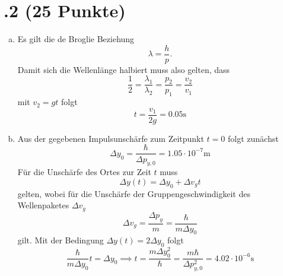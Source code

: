 \section*{\nr.2 \tittwo (25 Punkte)}
\begin{enumerate}[(a)]
\item Es gilt die de Broglie Beziehung
\begin{equation}
  \lambda=\frac{h}{p}.
\end{equation}
Damit sich die Wellenlänge halbiert muss also gelten, dass
\begin{equation}
  \frac{1}{2}=\frac{\lambda_1}{\lambda_2}=\frac{p_2}{p_1}=\frac{v_2}{v_1}
\end{equation}
mit $v_2=gt$ folgt
\begin{equation}
  t=\frac{v_1}{2g}=0.05\mathrm{s}
\end{equation}
\item Aus der gegebenen Impulsunschärfe zum Zeitpunkt $t=0$ folgt zunächst 
\begin{equation}
  \Delta y_0=\frac{\hbar}{\Delta p_{y,0}}=1.05\cdot 10^{-7}\mathrm{m}
\end{equation}
Für die Unschärfe des Ortes zur Zeit $t$ muss
\begin{equation}
  \Delta y(t)=\Delta y_0+\Delta v_g t
\end{equation}
gelten, wobei für die Unschärfe der Gruppengeschwindigkeit des Wellenpaketes $\Delta v_g$ 
\begin{equation}
  \Delta v_g = \frac{\Delta p_y}{m}= \frac{\hbar}{m\Delta y_0}
\end{equation}
gilt.
Mit der Bedingung $\Delta y(t)=2\Delta y_0$ folgt
\begin{equation}
\frac{\hbar}{m\Delta y_0}t=\Delta y_0\implies t=\frac{m\Delta y_0^2}{\hbar}=\frac{m\hbar}{\Delta p_{y,0}^2}=4.02\cdot10^{-6}\mathrm{s}
\end{equation}
\end{enumerate}